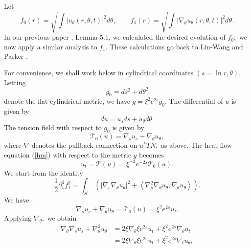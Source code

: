 \documentclass[12pt]{amsart}
\newcommand{\T}{{\mathcal T}}
\theoremstyle{others}
\numberwithin{equation}{section}
\def\<{\left\langle} \def\>{\right\rangle}
\def\({\left(} \def\){\right)}
\newcommand{\Om}{\Omega}
\renewcommand{\th}{\theta}
\newcommand{\p}{\partial}
\newcommand{\n}{\nabla}
\begin{document}
Let
\begin{equation*}%
f_0(r) = \sqrt{ \int |u_\th (r,\theta,t)|^2 d\th}, \qquad f_1(r) = \sqrt{ \int |\nabla_\theta u_\th (r,\theta,t)|^2 d\th }.
\end{equation*}
In our previous paper \cite{songwaldron}, Lemma 5.1, we calculated the desired evolution of $f_0;$ we now apply a similar analysis to $f_1.$ These calculations go back to Lin-Wang \cite{linwangenergyidentity} and Parker \cite{parkerhmbubbletree}.



For convenience, we shall work below in cylindrical coordinates $(s=\ln r,\th).$ Letting
$$g_0=ds^2+d\th^2$$
denote the flat cylindrical metric, we have $g=\xi^{2} e^{2s} g_0.$
The differential of $u$ is given by
\begin{equation*}
du = u_s ds + u_\theta d\theta.
\end{equation*}
The tension field with respect to $g_0$ is given by
\[ \mathcal{T}_0(u)=\n_s u_s+\n_\th u_\th,\]
where $\n$ denotes the pullback connection on $u^*TN,$ as above.
The heat-flow equation (\ref{hm}) with respect to the metric $g$ becomes
\begin{equation}\label{e:hm-cylin}
u_t = \mathcal{T}(u) = \xi^{-2}e^{-2s}\mathcal{T}_0(u).
\end{equation}
We start from the identity
\begin{equation}\label{ds2f12}
\frac12 \p_s^2f_1^2= \int_{S^1}\( |\n_s \nabla_\theta u_{\th}|^2+\< \n_s^2 \nabla_\theta u_{\th}, \nabla_\theta u_\th\>\).
\end{equation}
We have
\begin{equation}\label{T0ut}
\nabla_s u_s + \nabla_\theta u_\theta = \T_0(u) =  \xi^2 e^{2s} u_t.
\end{equation}
Applying $\n_\theta,$ we obtain
\begin{equation*}
\begin{split}
\nabla_\theta \nabla_s u_s + \nabla^2_\theta u_\theta & = 2 \xi \nabla_\theta \xi e^{2s} u_t + \xi^2 e^{2s} \nabla_\theta u_t \\
& =2 \xi \nabla_\theta \xi e^{2s} u_t + \xi^2 e^{2s} \nabla_t u_\theta,
\end{split}
\end{equation*}
\end{document}
